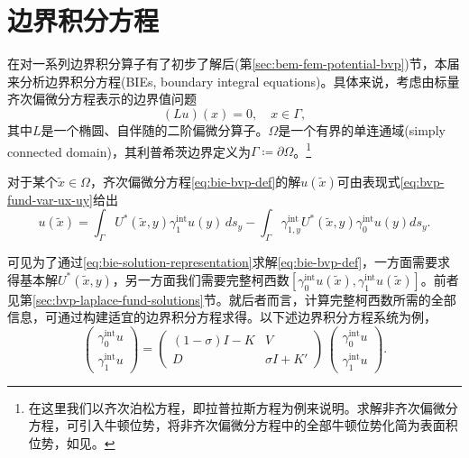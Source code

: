 \section{边界积分方程}
\label{sec:bie}

在对一系列边界积分算子有了初步了解后(第\ref{sec:bem-fem-potential-bvp})节，本届来分析边界积分方程(BIEs, boundary integral equations)。具体来说，考虑由标量齐次偏微分方程表示的边界值问题
\begin{equation}
  \label{eq:bie-bvp-def}
  \left(L u \right)(x) = 0, \quad x \in \Gamma,
\end{equation}
其中$L$是一个椭圆、自伴随的二阶偏微分算子。$\Omega$是一个有界的单连通域(simply connected domain)，其利普希茨边界定义为$\Gamma \coloneqq \partial \Omega$。\footnote{在这里我们以齐次泊松方程，即拉普拉斯方程为例来说明。求解非齐次偏微分方程，可引入牛顿位势，将非齐次偏微分方程中的全部牛顿位势化简为表面积位势，如见\cite{Jung:2002jk,Of:2010gt}。}

对于某个$\widetilde{x} \in \Omega$，齐次偏微分方程\eqref{eq:bie-bvp-def}的解$u(\widetilde{x})$可由表现式\eqref{eq:bvp-fund-var-ux-uy}给出
\begin{equation}
  \label{eq:bie-solution-representation}
  u(\widetilde{x}) = \int_{\Gamma} U^{*}(\widetilde{x}, y) \gamma_{1}^{\text{int}} u(y) \, d s_{y}
  - \int_{\Gamma} \gamma_{1,y}^{\text{int}} U^{*}(\widetilde{x}, y) \gamma_{0}^{\text{int}} u(y) d s_{y}.
\end{equation}

可见为了通过\eqref{eq:bie-solution-representation}求解\eqref{eq:bie-bvp-def}，一方面需要求得基本解$U^{*}(\widetilde{x},y)$，另一方面我们需要完整柯西数$\left[ \gamma_{0}^{\text{int}} u(\widetilde{x}), \gamma_{1}^{\text{int}} u(\widetilde{x}) \right]$。前者见第\ref{sec:bvp-laplace-fund-solutions}节。就后者而言，计算完整柯西数所需的全部信息，可通过构建适宜的边界积分方程求得。以下述边界积分方程系统为例，
\begin{equation}
  \label{eq:bie-system-boundary}
  \begin{pmatrix}
    \gamma_{0}^{\text{int}} u \\
    \gamma_{1}^{\text{int}} u
  \end{pmatrix}
  =
  \begin{pmatrix}
    \left( 1-\sigma \right) I - K & V \\
    D & \sigma I + K'
  \end{pmatrix}
  \,
  \begin{pmatrix}
    \gamma_{0}^{\text{int}} u \\
    \gamma_{1}^{\text{int}} u
  \end{pmatrix}.
\end{equation}


